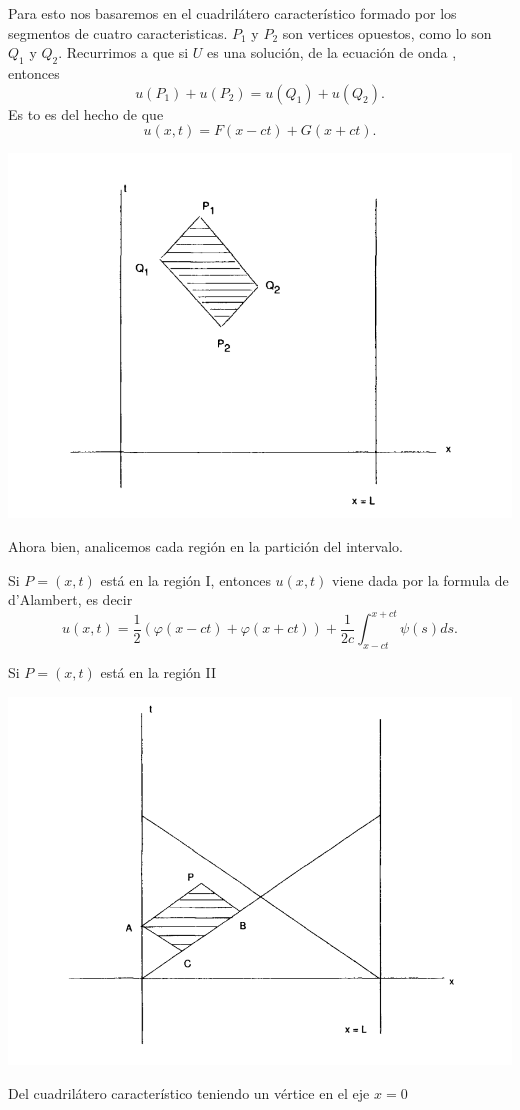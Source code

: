 \documentclass[11pt]{book}
\theoremstyle{plain}
\theoremstyle{definition}
\begin{document}
Para esto nos basaremos en el cuadrilátero característico formado por los segmentos de cuatro caracteristicas. $P_{1}$ y $P_{2}$ son vertices opuestos, como lo son $Q_{1}$ y $Q_{2}$. Recurrimos a que si $U$ es una solución, de la ecuación de onda , entonces
\[u(P_{1}) + u(P_{2}) = u(Q_{1}) + u(Q_{2}).\]
Es to es del hecho de que
\[u(x,t) = F(x-ct) + G(x+ct).\]
\begin{center}
    \includegraphics[scale=0.2]{CuadrilateroCaracteristico.png}
\end{center}
Ahora bien, analicemos cada región en la partición del intervalo.

Si $P = (x,t)$ está en la región I, entonces $u(x,t)$ viene dada por la formula de d'Alambert, es decir
\[
u(x,t) = \frac{1}{2}\left( \varphi(x - ct) +  \varphi(x + ct) \right) + \frac{1}{2c} \int_{x-ct}^{x+ct} \psi(s)ds
.\]

Si $P = (x,t)$ está en la región II 
\begin{center}
    \includegraphics[scale=0.2]{RegionII.png}
\end{center}
Del cuadrilátero característico teniendo un vértice en el eje $x=0$
\end{document}
